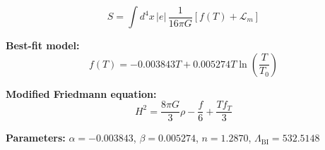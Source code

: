 
\begin{equation}
  S = \int d^4x \, |e| \, \frac{1}{16\pi G} \left[ f(T) + \mathcal{L}_m \right]
\end{equation}

\textbf{Best-fit model:}
\begin{equation}
  f(T) = -0.003843 T + 0.005274 T \ln\!\left(\frac{T}{T_0}\right)
\end{equation}

\textbf{Modified Friedmann equation:}
\begin{equation}
  H^2 = \frac{8\pi G}{3} \rho - \frac{f}{6} + \frac{T f_T}{3}
\end{equation}

\textbf{Parameters:}
$\alpha = -0.003843$, \quad
$\beta = 0.005274$, \quad
$n = 1.2870$, \quad
$\Lambda_{\text{BI}} = 532.5148$